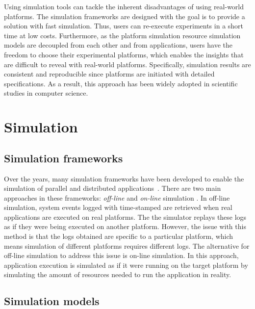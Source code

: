 Using simulation tools can tackle the inherent disadvantages of using 
real-world platforms. 
The simulation frameworks are designed with the goal is to provide 
a solution with fast simulation. 
Thus, users can re-execute experiments in a short time at low costs.
Furthermore, as the platform simulation resource simulation models 
are decoupled from each other and from applications, users have 
the freedom to choose their experimental platforms, which enables the 
insights that are difficult to reveal with real-world platforms. 
Specifically, simulation results are consistent and reproducible since 
platforms are initiated with detailed specifications. 
As a result, this approach has been widely adopted in scientific studies
in computer science. 

\section{Simulation}

\subsection{Simulation frameworks}

Over the years, many simulation frameworks have been developed to enable 
the simulation of parallel and distributed 
applications~\cite{optorsim, gridsim, groudsim, cloudsim,
nunez2012simcan,nunez2012icancloud, mdcsim, dissect_cf,
cloudnetsimplusplus, fognetsimplusplus, casanova2014simgrid,
ROSS, casanova2020fgcs}. 
There are two main approaches in these frameworks: \textit{off-line} and 
\textit{on-line} simulation \cite{casanova2014simgrid}. 
In off-line simulation, system events logged with time-stamped are retrieved 
when real applications are executed on real platforms.
The the simulator replays these logs as if they were being executed 
on another platform. 
However, the issue with this method is that the logs obtained are specific to 
a particular platform, which means simulation of different platforms 
requires different logs.
The alternative for off-line simulation to address this issue is 
on-line simulation.
In this approach, application execution is simulated as if it were running 
on the target platform by simulating the amount of resources needed 
to run the application in reality. 

\subsection{Simulation models}

